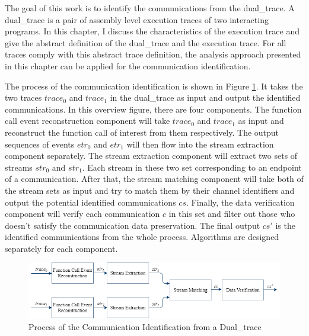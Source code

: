 


\label{chapter:alo}
The goal of this work is to identify the communications from the dual\_trace. A dual\_trace is a pair of assembly level execution traces of two interacting programs. In this chapter, I discuss the characteristics of the execution trace and give the abstract definition of the dual\_trace and the execution trace. For all traces comply with this abstract trace definition, the analysis approach presented in this chapter can be applied for the communication identification.

The process of the communication identification is shown in Figure \ref{overview}. It takes the two traces $trace_0$ and $trace_1$ in the dual\_trace as input and output the identified communications. In this overview figure, there are four components. The function call event reconstruction component will take $trace_0$ and $trace_1$ as input and reconstruct the function call of interest from them respectively. The output sequences of events $etr_0$ and $etr_1$ will then flow into the stream extraction component separately. The stream extraction component will extract two sets of streams $str_0$ and $str_1$. Each stream in these two set corresponding to an endpoint of a communication. After that, the stream matching component will take both of the stream sets as input and try to match them by their channel identifiers and output the potential identified communications $cs$. Finally, the data verification component will verify each communication $c$ in this set and filter out those who doesn't satisfy the communication data preservation. The final output $cs'$ is the identified communications from the whole process. Algorithms are designed separately for each component.

\begin{figure}[H]
\centerline{\includegraphics[scale=0.6]{Figures/overview}}
\caption{Process of the Communication Identification from a Dual\_trace}
\label{overview}
\end{figure}

